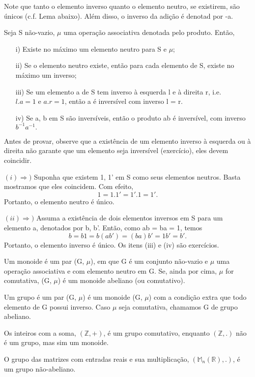 \documentclass[algebra_notes.tex]{subfiles}
\begin{document}
Note que tanto o elemento inverso quanto o elemento neutro, se existirem, são únicos (c.f. Lema abaixo). Além disso, o inverso da adição é
denotad por -a.
\begin{lemma*}
	Seja S não-vazio, $\mu$ uma operação associativa denotada pelo produto. Então,
	\begin{itemize}
		\item[i)] Existe no máximo um elemento neutro para S e $\mu$;
		\item[ii)] Se o elemento neutro existe, então para cada elemento de S, existe no máximo um inverso;
		\item[iii)] Se um elemento a de S tem inverso \`a esquerda l e \`a direita r, i.e. $l.a = 1 \text{ e } a.r = 1$, então
		      a é inversível com inverso l = r.
		\item[iv)] Se a, b em S são inversíveis, então o produto ab é inversível, com inverso $b^{-1}a^{-1}.$
	\end{itemize}
\end{lemma*}
Antes de provar, observe que a existência de um elemento inverso \`a esquerda ou \`a direita não garante que um elemento
seja inversível (exercício), eles devem coincidir.
\begin{proof*}
	$(i)\Rightarrow)$ Suponha que existem 1, 1' em S como seus elementos neutros. Basta mostramos que eles coincidem. Com efeito,
	$$
		1 = 1.1' = 1'.1 = 1'.
	$$
	Portanto, o elemento neutro é único.

	$(ii)\Rightarrow)$ Assuma a existência de dois elementos inversos em S para um elemento a, denotados por b, b'. Então, como
	ab = ba = 1, temos
	$$
		b = b1 = b(ab') = (ba)b' = 1b' = b'.
	$$
	Portanto, o elemento inverso é único. Os itens (iii) e (iv) são exercícios. \qedsymbol
\end{proof*}

\begin{def*}
	Um monoide é um par (G, $\mu$), em que G é um conjunto não-vazio e $\mu$ uma operação associativa e com elemento neutro em G.
	Se, ainda por cima, $\mu$ for comutativa, (G, $\mu$) \' e um monoide abeliano (ou comutativo).
\end{def*}
\begin{def*}
	Um grupo é um par (G, $\mu$) é um monoide (G, $\mu$) com a condição extra que todo elemento de G possui inverso. Caso
	$\mu$ seja comutativa, chamamos G de grupo abeliano.
\end{def*}
\begin{example*}
	Os inteiros com a soma, $(\mathbb{Z}, +)$, é um grupo comutativo, enquanto $(\mathbb{Z}, .)$ não é um grupo, mas sim um monoide.
\end{example*}
\begin{example*}
	O grupo das matrizes com entradas reais e sua multiplicação, $(\mathbb{M}_{n}(\mathbb{R}), .)$, é um grupo não-abeliano.
\end{example*}
\end{document}
